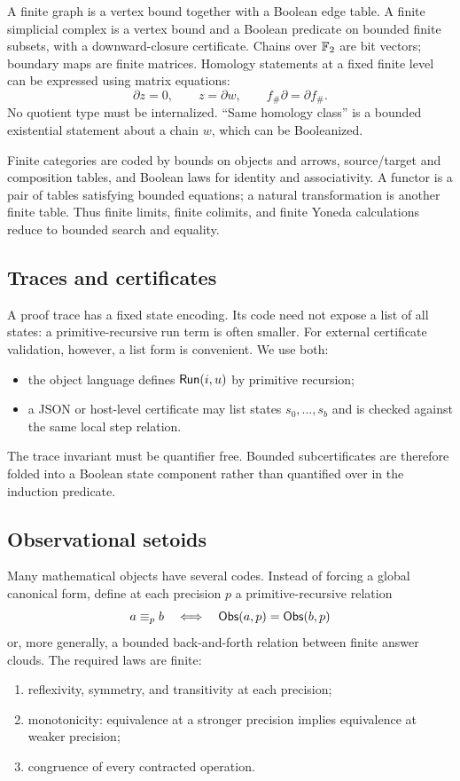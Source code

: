 A finite graph is a vertex bound together with a Boolean edge table.  A finite
simplicial complex is a vertex bound and a Boolean predicate on bounded finite
subsets, with a downward-closure certificate.  Chains over \(\mathbb F_2\) are bit
vectors; boundary maps are finite matrices.  Homology statements at a fixed
finite level can be expressed using matrix equations:
\[
  \partial z=0,
  \qquad z=\partial w,
  \qquad f_\#\partial=\partial f_\#.
\]
No quotient type must be internalized.  ``Same homology class'' is a bounded
existential statement about a chain \(w\), which can be Booleanized.

Finite categories are coded by bounds on objects and arrows, source/target and
composition tables, and Boolean laws for identity and associativity.  A
functor is a pair of tables satisfying bounded equations; a natural
transformation is another finite table.  Thus finite limits, finite colimits,
and finite Yoneda calculations reduce to bounded search and equality.

\subsection{Traces and certificates}

A proof trace has a fixed state encoding.  Its code need not expose a list of
all states: a primitive-recursive run term is often smaller.  For external
certificate validation, however, a list form is convenient.  We use both:
\begin{itemize}
\item the object language defines \(\mathsf{Run}(i,u)\) by primitive recursion;
\item a JSON or host-level certificate may list states
\(s_0,\ldots,s_b\) and is checked against the same local step relation.
\end{itemize}

The trace invariant must be quantifier free.  Bounded subcertificates are
therefore folded into a Boolean state component rather than quantified over in
the induction predicate.

\subsection{Observational setoids}

Many mathematical objects have several codes.  Instead of forcing a global
canonical form, define at each precision \(p\) a primitive-recursive relation
\[
      a\equiv_p b
      \quad\Longleftrightarrow\quad
      \mathsf{Obs}(a,p)=\mathsf{Obs}(b,p)
\]
or, more generally, a bounded back-and-forth relation between finite answer
clouds.  The required laws are finite:
\begin{enumerate}
\item reflexivity, symmetry, and transitivity at each precision;
\item monotonicity: equivalence at a stronger precision implies equivalence at
weaker precision;
\item congruence of every contracted operation.
\end{enumerate}

